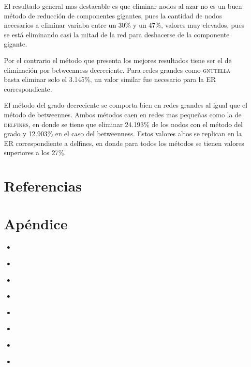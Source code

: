 \documentclass[letterpaper]{article}
\newcommand{\python}[2]{
    \begin{itemize}
        \item[]
    \end{itemize}
}
\begin{document}
El resultado general mas destacable es que eliminar nodos al azar no es un buen método de reducción de componentes gigantes, pues la cantidad de nodos necesarios a eliminar variaba entre un 30\% y un 47\%, valores muy elevados, pues se está eliminando casi la mitad de la red para deshacerse de la componente gigante.

Por el contrario el método que presenta los mejores resultados tiene ser el de eliminación por betweenness decreciente. Para redes grandes como \textsc{gnutella} basta eliminar solo el 3.145\%, un valor similar fue necesario para la ER correspondiente.

El método del grado decreciente se comporta bien en redes grandes al igual que el método de betweennes. Ambos métodos caen en redes mas pequeñas como la de \textsc{delfines}, en donde se tiene que eliminar 24.193\% de los nodos con el método del grado y 12.903\% en el caso del betweenness. Estos valores altos se replican en la ER correspondiente a delfines, en donde para todos los métodos se tienen valores superiores a los 27\%.

\section{Referencias}
\section{Apéndice}

\python{codigos/p1.py}{p1.py}
\python{codigos/p2.py}{p2.py}
\python{codigos/p3.py}{p3.py}
\python{codigos/p4.py}{p4.py}
\python{codigos/p5-1-gnutella.py}{p5-1-gnutella.py}
\python{codigos/p5-2-delfines.py}{p5-2-delfines.py}
\python{codigos/p5-3-erdos-renyi-gnutella.py}{p5-3-erdos-renyi-gnutella.py}
\python{codigos/p5-4-erdos-renyi-delfines.py}{p5-3-erdos-renyi-delfines.py}
\end{document}
